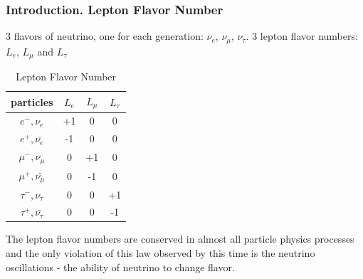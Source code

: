 \begin{frame}\frametitle{Introduction. Lepton Flavor Number}
\scriptsize
3 flavors of neutrino, one for each generation: $\nu_e$, $\nu_\mu$, $\nu_\tau$. 3 lepton flavor numbers: $L_e$, $L_{\mu}$ and $L_{\tau}$ 

\begin{table}[h]
  \begin{center}
  \caption{ Lepton Flavor Number}
  \begin{tabular}{|c|c|c|c|}
     particles & $L_e$ & $L_{\mu}$ & $L_{\tau}$ \\ \hline
     $e^-,\nu_e$ &  +1  &  0  &  0  \\ \hline 
     $e^+, \bar{\nu_e}$ &  -1  &  0  &  0  \\ \hline 
     $\mu^-,\nu_{\mu}$ &  0  &  +1  &  0  \\ \hline 
     $\mu^+, \bar{\nu_{\mu}}$ &  0  &  -1  &  0  \\ \hline 
     $\tau^-,\nu_{\tau}$ &  0  &  0  &  +1  \\ \hline 
     $\tau^+, \bar{\nu_{\tau}}$ &  0  &  0  &  -1  \\ \hline 
  \end{tabular}
  \label{tab:LeptonFlavorNumber}
  \end{center}
\end{table}
\scriptsize
The lepton flavor numbers are conserved in almost all particle physics processes and the only violation of this law observed by this time is the neutrino oscillations - the ability of neutrino to change flavor. 
\end{frame}
